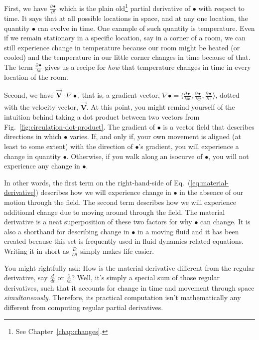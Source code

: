First, we have $\frac{\partial \bullet}{\partial t}$ which is the plain old\footnote{See Chapter~\ref{chap:changes}.} partial derivative of $\bullet$ with respect to time. It says that at all possible locations in space, and at any one location, the quantity $\bullet$ can evolve in time. One example of such quantity is temperature. Even if we remain stationary in a specific location, say in a corner of a room, we can still experience change in temperature because our room might be heated (or cooled) and the temperature in our little corner changes in time because of that. The term $\frac{\partial \bullet}{\partial t}$ gives us a recipe for \textit{how} that temperature changes in time in every location of the room.

Second, we have $\vec{\bm{V}} \cdot \nabla \bullet$, that is, a gradient vector, $\nabla \bullet = \langle \frac{\partial \bullet}{\partial x}, \frac{\partial \bullet}{\partial y}, \frac{\partial \bullet}{\partial z} \rangle$, dotted with the velocity vector, $\vec{\bm{V}}$. At this point, you might remind yourself of the intuition behind taking a dot product between two vectors from Fig.~\ref{fig:circulation-dot-product}. The gradient of $\bullet$ is a vector field that describes directions in which $\bullet$ varies. If, and only if, your own movement is aligned (at least to some extent) with the direction of $\bullet$'s gradient, you will experience a change in quantity $\bullet$. Otherwise, if you walk along an isocurve of $\bullet$, you will not experience any change in $\bullet$.

In other words, the first term on the right-hand-side of Eq.~(\ref{eq:material-derivative}) describes how we will experience change in $\bullet$ in the absence of our motion through the field. The second term describes how we will experience additional change due to moving around through the field. The material derivative is a neat superposition of these two factors for why $\bullet$ can change. It is also a shorthand for describing change in $\bullet$ in a moving fluid and it has been created because this set is frequently used in fluid dynamics related equations. Writing it in short as $\frac{D}{D t}$ simply makes life easier.

You might rightfully ask: How is the material derivative different from the regular derivative, say $\frac{d}{dt}$ or $\frac{\partial}{\partial t}$? Well, it's simply a special sum of those regular derivatives, such that it accounts for change in time and movement through space \textit{simultaneously}. Therefore, its practical computation isn't mathematically any different from computing regular partial derivatives. 

